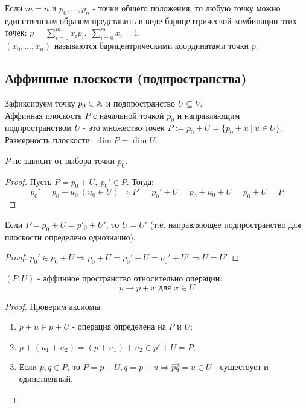 \begin{consequense}
    Если $m = n$ и $p_0,...,p_n$ - точки общего положения, то любую точку можно единственным образом представить в виде барицентрической комбинации этих точек: $p = \sum \limits_{i=0}^m x_ip_i, \ \sum \limits_{i=0}^m x_i = 1$.\\
    $(x_0,...,x_n)$ называются барицентрическими координатами точки $p$.
\end{consequense}
\subsection{Аффинные плоскости (подпространства)}
\begin{definition}
    Зафиксируем точку $p_0 \in \mathbb{A}$ и подпространство $U \subseteq V$.\\
    Аффинная плоскость $P$ с начальной точкой $p_0$ и направляющим подпространством $U$ - это множество точек $P := p_0 + U = \{p_0 + u \ | \ u \in U\}$.\\
    Размерность плоскости: $\dim P = \dim U$.
\end{definition}
\begin{subtheorem}
    $P$ не зависит от выбора точки $p_0$.
\end{subtheorem}
\begin{proof}
    Пусть $P = p_0 + U, \ p_0' \in P$. Тогда:
    $$p_0' = p_0 + u_0 \ (u_0 \in U) \Longrightarrow P' = p_0' + U = p_0 + u_0 + U = p_0 + U = P$$
\end{proof}
\begin{subtheorem}
    Если $P = p_0 + U = p'_0 + U'$, то $U = U'$ (т.е. направляющее подпространство для плоскости определено однозначно).
\end{subtheorem}
\begin{proof}
    $p_0' \in p_0 + U \Longrightarrow p_0 + U = p_0' + U = p_0' + U' \Longrightarrow U = U'$
\end{proof}
\begin{subtheorem}
    $(P, U)$ - аффинное пространство относительно операции: $$p \rightarrow p + x \text{ для } x \in U$$
\end{subtheorem}
\begin{proof}
    Проверим аксиомы:
    \begin{enumerate}
        \item $p + u \in p + U$ - операция определена на $P$ и $U$;
        \item $p + (u_1 + u_2) = (p + u_1) + u_2 \in p' + U = P$;
        \item Если $p, q \in P$, то $P = p + U, q = p + u \Longrightarrow \overrightarrow{pq} = u \in U$ - существует и единственный.
    \end{enumerate}
\end{proof}

